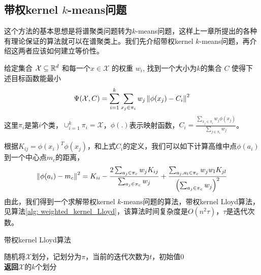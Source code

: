 \subsection{带权kernel \texorpdfstring{$k$}{k}-means问题}
这个方法的基本思想是将谱聚类问题转为$k$-means问题，这样上一章所提出的各种有理论保证的算法就可以在谱聚类上。我们先介绍带权kernel $k$-means问题，再介绍这两者应该如何建立等价性。
\begin{definition}
    \label{def: weighted_kernel_kmeans}
    给定集合 $\mathcal{X} \subseteq \mathbb{R}^d$ 和每一个$x \in \mathcal{X}$ 的权重 $w_i$, 找到一个大小为$k$的集合 $C$ 使得下述目标函数能最小
    \begin{equation*}
        \Psi(\mathcal{X},C) = \sum_{i=1}^k \sum_{x_j \in \pi_i}w_j \left\lVert\phi(x_j)-C_i\right\rVert^2
    \end{equation*}
    这里$\pi_i$是第$i$个类，$\cup_{i=1}^k \pi_i = \mathcal{X}$，$\phi(.)$表示映射函数，$C_i = \frac{\sum_{x_j \in \pi_i}w_j \phi(x_j)}{\sum_{j \in \pi_i}w_j}$。
\end{definition}
根据$K_{ij} = \phi(x_i)^T\phi(x_j)$，和上式$C_i$的定义，我们可以如下计算高维中点$\phi(a_i)$到一个中心点$m_c$的距离，
\begin{equation*}
	\left\lVert\phi(a_i) - m_c\right\rVert^2 = K_{i i}-\frac{2 \sum_{a_{j} \in \pi_{c}} w_{j} K_{i j}}{\sum_{a_{j} \in \pi_{c}} w_{j}}+\frac{\sum_{a_{j}, a_{l} \in \pi_{c}} w_{j} w_{l} K_{j l}}{\left(\sum_{a_{j} \in \pi_{c}} w_{j}\right)^{2}}
\end{equation*}
由此，我们得到一个求解带权kernel $k$-means问题的算法，带权kernel Lloyd算法，见算法\ref{alg: weighted_kernel_Lloyd}，该算法时间复杂度是$O(n^2 \tau)$，$\tau$是迭代次数。
\begin{algorithm}
    \caption{带权kernel Lloyd算法}\label{alg: weighted_kernel_Lloyd}
    随机将$\mathcal{X}$划分，记划分为$\pi$，当前的迭代次数为$t$，初始值0\\
    \textbf{返回}$\mathcal{X}$的$k$个划分
\end{algorithm}
